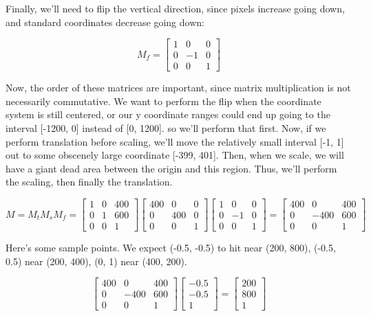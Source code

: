 \documentclass{article}
\begin{document}
Finally, we'll need to flip the vertical direction, since pixels increase going 
down, and standard coordinates decrease going down:

$$
M_f = \begin{bmatrix}
1 &  0 & 0 \\
0 & -1 & 0 \\
0 &  0 & 1
\end{bmatrix}
$$

Now, the order of these matrices are important, since matrix multiplication is 
not necessarily commutative. We want to perform the flip when the coordinate 
system is still centered, or our y coordinate ranges could end up going to the 
interval [-1200, 0] instead of [0, 1200]. so we'll perform that first. Now, if 
we perform translation before scaling, we'll move the relatively small interval 
[-1, 1] out to some obscenely large coordinate [-399, 401]. Then, when we scale, 
we will have a giant dead area between the origin and this region. Thus, 
we'll perform the scaling, then finally the translation.

$$
M = M_t M_s M_f = \begin{bmatrix}
1 & 0 & 400 \\
0 & 1 & 600 \\
0 & 0 &   1
\end{bmatrix} \begin{bmatrix}
400 &   0 & 0 \\
  0 & 400 & 0 \\
  0 &   0 & 1
\end{bmatrix} \begin{bmatrix}
1 &  0 & 0 \\
0 & -1 & 0 \\
0 &  0 & 1
\end{bmatrix} = \begin{bmatrix}
400 &    0 & 400 \\
  0 & -400 & 600 \\
  0 &    0 & 1
\end{bmatrix}
$$

Here's some sample points. We expect (-0.5, -0.5) to hit near (200, 800), 
(-0.5, 0.5) near (200, 400), (0, 1) near (400, 200).

$$
\begin{bmatrix}
400 &    0 & 400 \\
  0 & -400 & 600 \\
  0 &    0 & 1
\end{bmatrix} \begin{bmatrix}
-0.5\\
-0.5\\
1
\end{bmatrix} = \begin{bmatrix}
200\\
800\\
1
\end{bmatrix}
$$
\end{document}
